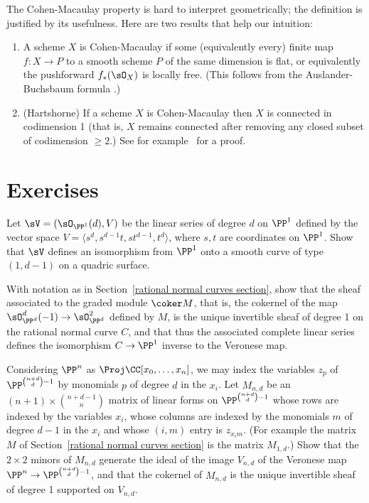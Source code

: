 \begin{fact}\label{meaning of ACM}
The Cohen-Macaulay property is hard to interpret geometrically; the definition is justified by its usefulness. Here are two results that help our intuition:
\begin{enumerate}
\item A scheme $X$ is Cohen-Macaulay if some (equivalently every) finite map $f: X\to P$ to a smooth scheme $P$
of the same dimension is flat, or equivalently the pushforward $f_*(\sO_X)$ is locally free. (This follows
from the Auslander-Buchsbaum formula \cite[Section 19.3]{Eisenbud1995}.)
\item (Hartshorne) If a scheme $X$ is Cohen-Macaulay then $X$ is connected in codimension 1 (that is, $X$ remains connected after removing any closed subset of codimension $\geq 2$.)
See for example~\cite[Theorem 18.12]{Eisenbud1995} for a proof.
\end{enumerate}
 
\end{fact}



\section{Exercises}

\begin{exercise}\label{1,d-1 on quadric}
Let $\sV =(\sO_{\PP^1}(d), V)$ be the linear series of degree $d$ on $\PP^1$ defined by the vector space 
$V = \langle s^{d},s^{d-1}t, st^{d-1}, t^d\rangle$, where $s,t$ are coordinates on $\PP^1$. Show that $\sV$ defines
an isomorphism from $\PP^1$ onto a smooth curve of type $(1,d-1)$ on a quadric surface.
\end{exercise}

\begin{exercise}\label{veronese inverse}
With notation as in Section~\ref{rational normal curves section}, show that the sheaf associated to the graded module $\coker M$,
that is, the cokernel of the map $\sO_{\PP^d}^d(-1) \to \sO_{\PP^d}^2$ defined by $M$, is the unique invertible sheaf of degree 1
on the rational normal curve $C$, and that thus the associated complete linear series defines the isomorphism $C\to \PP^1$ inverse
to the Veronese map.
\end{exercise}

\begin{exercise}\label{equations of Veroneses}
Considering $\PP^n$ as $\Proj \CC[x_0,\dots,x_n]$, we may index the variables $z_p$ of $\PP^{\binom{n+d}{d}-1}$ by  monomials $p$
of degree $d$ in the $x_i$. Let $M_{n,d}$ be an $(n+1)\times \binom{n+d-1}{n}$ matrix of linear forms
on $\PP^{\binom{n+d}{d}-1}$ whose rows are indexed by the variables $x_i$, whose columns are indexed by the monomials $m$ of degree $d-1$ in the $x_i$ and
whose $(i,m)$ entry is $z_{x_im}$. (For example the matrix
$M$ of Section~\ref{rational normal curves section} is the matrix $M_{1,d}$.) Show that the $2\times 2$ minors of $M_{n,d}$ generate the ideal of the image $V_{n,d}$ of the Veronese map 
$\PP^n\to \PP^{\binom{n+d}{d}-1}$, and that the cokernel of $M_{n,d}$ is the unique invertible sheaf of degree 1 supported on $V_{n,d}$.
\end{exercise}

